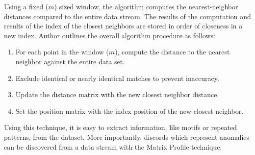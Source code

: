 Using a fixed ($m$) sized window, the algorithm computes the nearest-neighbor distances compared to the entire data stream.
The results of the computation and results of the index of the closest neighbors are stored in order of closeness in a new index. Author \cite{matrix-profile-intro} outlines the overall algorithm procedure as follows:
\begin{enumerate}
    \item For each point in the window ($m$), compute the distance to the nearest neighbor against the entire data set.
    \item Exclude identical or nearly identical matches to prevent inaccuracy.
    \item Update the distance matrix with the new closest neighbor distance.
    \item Set the position matrix with the index position of the new closest neighbor.
\end{enumerate}

Using this technique, it is easy to extract information, like motifs or repeated patterns, from the dataset.
More importantly, discords which represent anomalies can be discovered from a data stream with the Matrix Profile technique.







